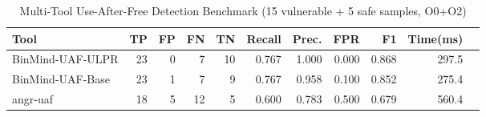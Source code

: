 \begin{table}[h]
\centering
\caption{Multi-Tool Use-After-Free Detection Benchmark (15 vulnerable + 5 safe samples, O0+O2)}
\label{tab:uaf_benchmark}
\begin{tabular}{lrrrrrrrrrr}
\toprule
Tool & TP & FP & FN & TN & Recall & Prec. & FPR & F1 & Time(ms) \\
\midrule
BinMind-UAF-ULPR & 23 & 0 & 7 & 10 & 0.767 & 1.000 & 0.000 & 0.868 & 297.5 \\
BinMind-UAF-Base & 23 & 1 & 7 & 9 & 0.767 & 0.958 & 0.100 & 0.852 & 275.4 \\
angr-uaf & 18 & 5 & 12 & 5 & 0.600 & 0.783 & 0.500 & 0.679 & 560.4 \\
\bottomrule
\end{tabular}
\end{table}